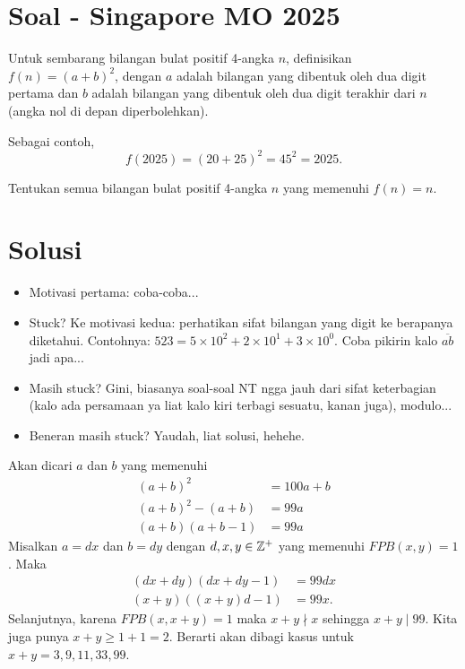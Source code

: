 \section{Soal - Singapore MO 2025}
Untuk sembarang bilangan bulat positif 4-angka $n$, definisikan $f(n)=(a+b)^2$, dengan $a$ adalah bilangan yang dibentuk oleh dua digit pertama dan $b$ adalah bilangan yang dibentuk oleh dua digit terakhir dari $n$ (angka nol di depan diperbolehkan).

Sebagai contoh,
$$f(2025) = (20+25)^2 = 45^2 = 2025.$$

Tentukan semua bilangan bulat positif 4-angka $n$ yang memenuhi $f(n)=n$.

\newpage
\section{Solusi}
\begin{remark*}
    \begin{itemize}
        \item Motivasi pertama: coba-coba...
        \item Stuck? Ke motivasi kedua: perhatikan sifat bilangan yang digit ke berapanya diketahui. Contohnya: $523 = 5 \times 10^2 + 2 \times 10^1 + 3 \times 10^0$. Coba pikirin kalo $\overline{ab}$ jadi apa...
        \item Masih stuck? Gini, biasanya soal-soal NT ngga jauh dari sifat keterbagian (kalo ada persamaan ya liat kalo kiri terbagi sesuatu, kanan juga), modulo...
        \item Beneran masih stuck? Yaudah, liat solusi, hehehe.
    \end{itemize}
\end{remark*}
Akan dicari $a$ dan $b$ yang memenuhi
\begin{align*}
    (a+b)^2&=100a+b\\
    (a+b)^2 - (a+b) &= 99a\\
    (a+b)(a+b-1) &= 99a
\end{align*}
Misalkan $a = dx$ dan $b = dy$ dengan $d,x,y \in \mathbb Z^+$  yang memenuhi $FPB(x,y) = 1$. Maka
\begin{align*}
    (dx+dy)(dx+dy-1) &= 99dx\\
    (x+y)((x+y)d-1) &= 99x.
\end{align*}
Selanjutnya, karena $FPB(x,x+y)=1$ maka $x+y \nmid x$ sehingga $x+y \mid 99$. Kita juga punya $x+y \ge 1+1 = 2$. Berarti akan dibagi kasus untuk $x+y=3,9,11,33,99$.
